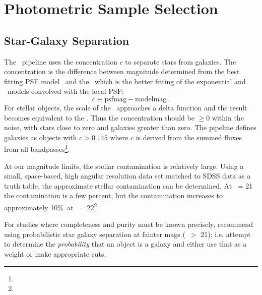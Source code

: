 \documentclass[12pt,preprint]{aastex}
\newcommand{\contamworst}{10\%}
\begin{document}

    

\section{Photometric Sample Selection} \label{sec:select}

\subsection{Star-Galaxy Separation} \label{sec:sg}

The \photo\ pipeline uses the concentration $c$ to separate stars from
galaxies.  The concentration is the difference between magnitude determined
from the best fitting PSF model \psfmag\ and the \modelmag\, which is
the better fitting of the exponential and \devauc\ models convolved
with the local PSF:
\begin{equation}
c \equiv \textrm{psfmag} - \textrm{modelmag}~.
\end{equation}
For stellar objects, the scale of the \modelmag\ approaches a delta function and
the result becomes equivalent to the \psfmag.  Thus the concentration should be
$\ge 0$ within the noise, with stars close to zero and galaxies greater than
zero.  The pipeline defines galaxies as objects with $c > 0.145$ where $c$ is
derived from the summed fluxes from all bandpasses\footnote{\DRateclass}.  

At our magnitude limits, the stellar contamination is relatively large.  Using
a small, space-based, high angular resolution data set matched to SDSS data as
a truth table, the approximate stellar contamination can be determined.  At
\rmag\ = 21 the contamination is a few percent, but the contamination increases
to approximately \contamworst\ at \rmag\ = 22\footnote{\DRsevsg}.  

For studies where completeness and purity must be known precisely,
\citet{ScrantonMag05} recommend using probabilistic star galaxy separation at
fainter mags (\rmag\ $ > $ 21); i.e.  attempt to determine the {\it
probability} that an object is a galaxy and either use that as a weight or make
appropriate cuts. 
\end{document}
